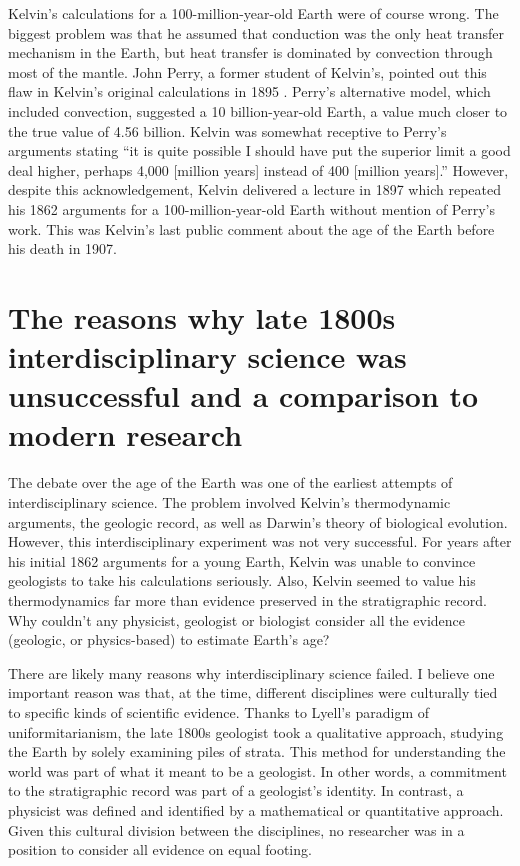 \documentclass[12pt]{article}
\begin{document}
Kelvin's calculations for a 100-million-year-old Earth were of course wrong. The biggest problem was that he assumed that conduction was the only heat transfer mechanism in the Earth, but heat transfer is dominated by convection through most of the mantle. John Perry, a former student of Kelvin's, pointed out this flaw in Kelvin's original calculations in 1895 \citep{England_2007}. Perry's alternative model, which included convection, suggested a 10 billion-year-old Earth, a value much closer to the true value of 4.56 billion. Kelvin was somewhat receptive to Perry's arguments stating ``it is quite possible I should have put the superior limit a good deal higher, perhaps 4,000 [million years] instead of 400 [million years].'' However, despite this acknowledgement, Kelvin delivered a lecture in 1897 which repeated his 1862 arguments for a 100-million-year-old Earth without mention of Perry's work. This was Kelvin's last public comment about the age of the Earth before his death in 1907.

\section{The reasons why late 1800s interdisciplinary science was unsuccessful and a comparison to modern research} \label{sec:3}

The debate over the age of the Earth was one of the earliest attempts of interdisciplinary science. The problem involved Kelvin's thermodynamic arguments, the geologic record, as well as Darwin's theory of biological evolution. However, this interdisciplinary experiment was not very successful. For years after his initial 1862 arguments for a young Earth, Kelvin was unable to convince geologists to take his calculations seriously. Also, Kelvin seemed to value his thermodynamics far more than evidence preserved in the stratigraphic record. Why couldn't any physicist, geologist or biologist consider all the evidence (geologic, or physics-based) to estimate Earth's age?

There are likely many reasons why interdisciplinary science failed. I believe one important reason was that, at the time, different disciplines were culturally tied to specific kinds of scientific evidence. Thanks to Lyell's paradigm of uniformitarianism, the late 1800s geologist took a qualitative approach, studying the Earth by solely examining piles of strata. This method for understanding the world was part of what it meant to be a geologist. In other words, a commitment to the stratigraphic record was part of a geologist's identity. In contrast, a physicist was defined and identified by a mathematical or quantitative approach. Given this cultural division between the disciplines, no researcher was in a position to consider all evidence on equal footing.
\end{document}
